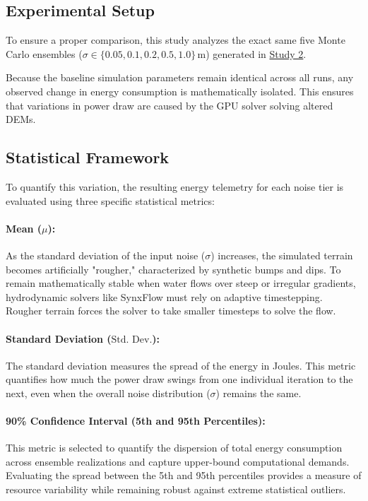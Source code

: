 \subsection{Experimental Setup}
\label{sec:res-study3-setup}

To ensure a proper comparison, this study analyzes the exact same five Monte Carlo ensembles ($\sigma \in \{0.05, 0.1, 0.2, 0.5, 1.0\}\,\text{m}$) generated in \hyperref[sec:res-study2]{Study 2}.

Because the baseline simulation parameters remain identical across all runs, any observed change in energy consumption is mathematically isolated. This ensures that variations in power draw are caused by the GPU solver solving altered DEMs.

\subsection{Statistical Framework}
To quantify this variation, the resulting energy telemetry for each noise tier is evaluated using three specific statistical metrics:

\paragraph{Mean ($\mu$):}
As the standard deviation of the input noise ($\sigma$) increases, the simulated terrain becomes artificially "rougher," characterized by synthetic bumps and dips. To remain mathematically stable when water flows over steep or irregular gradients, hydrodynamic solvers like SynxFlow must rely on adaptive timestepping. Rougher terrain forces the solver to take smaller timesteps to solve the flow.

\paragraph{Standard Deviation ($\text{Std. Dev.}$):}
The standard deviation measures the spread of the energy in Joules. This metric quantifies how much the power draw swings from one individual iteration to the next, even when the overall noise distribution ($\sigma$) remains the same.

\paragraph{90\% Confidence Interval (5th and 95th Percentiles):}
This metric is selected to quantify the dispersion of total energy consumption across ensemble realizations and capture upper-bound computational demands. Evaluating the spread between the 5th and 95th percentiles provides a measure of resource variability while remaining robust against extreme statistical outliers.

